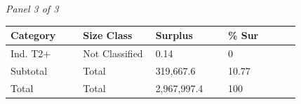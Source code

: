 \documentclass[12pt]{article}
\begin{document}
\begin{landscape}
\begin{table}[H]
\vspace{0.6em}

\textit{Panel 3 of 3}\\[2pt]
{\fontsize{12}{14}\selectfont
\setlength{\tabcolsep}{3pt}
\renewcommand{\arraystretch}{1.08}
\begin{tabular}{p{0.205\linewidth}p{0.205\linewidth}p{0.205\linewidth}p{0.205\linewidth}}
\toprule
Category & Size Class & Surplus & \% Sur \\
\midrule
Ind. T2+ & Not Classified & 0.14 & 0 \\
Subtotal & Total & 319,667.6 & 10.77 \\
Total & Total & 2,967,997.4 & 100 \\
\bottomrule
\end{tabular}
}
\end{table}
\end{landscape}
\end{document}
